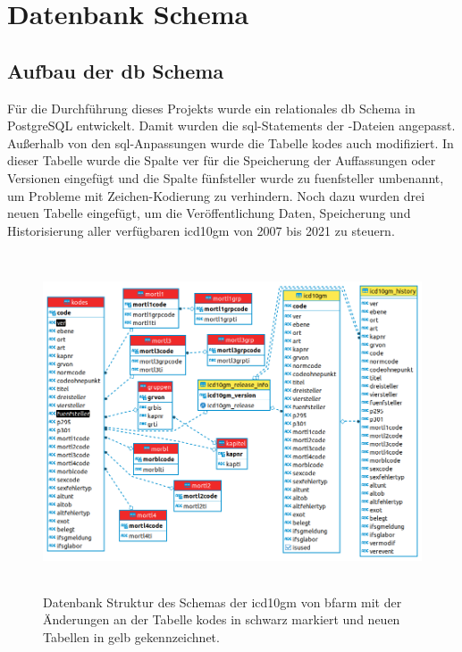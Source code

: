 \section{Datenbank Schema} \label{database}

\subsection{Aufbau der \acl{db} Schema} \label{dbdevelop}

Für die Durchführung dieses Projekts wurde ein relationales \ac{db} Schema in PostgreSQL entwickelt. Damit wurden die \ac{sql}-Statements der \grqq-Dateien \cite{readmel} angepasst. Außerhalb von den \ac{sql}-Anpassungen wurde die Tabelle {\ttfamily kodes} auch modifiziert. In dieser Tabelle wurde die Spalte {\ttfamily ver} für die Speicherung der Auffassungen oder Versionen eingefügt und die Spalte {\ttfamily fünfsteller} wurde zu {\ttfamily fuenfsteller} umbenannt, um Probleme mit Zeichen-Kodierung zu verhindern. Noch dazu wurden drei neuen Tabelle eingefügt, um die Veröffentlichung Daten, Speicherung und Historisierung aller verfügbaren \ac{icd10gm} von 2007 bis 2021 zu steuern.
	
	\begin{figure}[ht]
		\centering
		\includegraphics[height=10cm]{figures/icdSqlSchemaNew}
		\caption[Vorschlag der Datenbank Struktur von \acs{icd10gm}]{Datenbank Struktur des Schemas der \ac{icd10gm} von \ac{bfarm} mit der Änderungen an der Tabelle {\ttfamily kodes} in schwarz markiert und neuen Tabellen in gelb gekennzeichnet.}
		\label{fig:reldb2}
	\end{figure}
